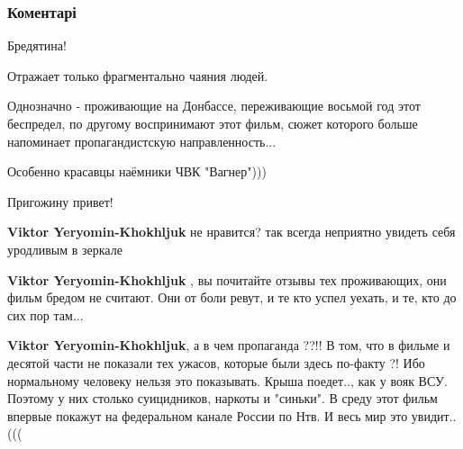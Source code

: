  
 
 
 
 
\subsubsection{Коментарі}

\begin{itemize}

 
Бредятина!

Отражает только фрагментально чаяния людей.

Однозначно - проживающие на Донбассе, переживающие восьмой год этот беспредел,
по другому воспринимают этот фильм, сюжет которого больше напоминает
пропагандистскую направленность...

Особенно красавцы наёмники ЧВК "Вагнер")))

Пригожину привет!

\begin{itemize}


\textbf{Viktor Yeryomin-Khokhljuk} не нравится? так всегда неприятно увидеть себя уродливым в зеркале

 
\textbf{Viktor Yeryomin-Khokhljuk} , вы почитайте отзывы тех проживающих, они
фильм бредом не считают. Они от боли ревут, и те кто успел уехать, и те, кто до
сих пор там...


\textbf{Viktor Yeryomin-Khokhljuk}, а в чем пропаганда ??!! В том, что в фильме
и десятой части не показали тех ужасов, которые были здесь по-факту ?! Ибо
нормальному человеку нельзя это показывать. Крыша поедет.., как у вояк ВСУ.
Поэтому у них столько суицидников, наркоты и "синьки". В среду этот фильм
впервые покажут на федеральном канале России по Нтв. И весь мир это увидит..
(((


\end{itemize}
\end{itemize}

